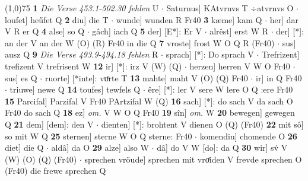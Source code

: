 \documentclass[8pt,a4paper,notitlepage]{article}
\begin{document}
\begin{table}[ht]
\begin{minipage}[t]{0.5\linewidth}
\line(1,0){75} \newline
\textbf{1} \textit{Die Verse 453.1-502.30 fehlen} U   $\cdot$ Saturnus] KAtvrnvs T ÷atvrnvs O  $\cdot$ loufet] heűfet Q \textbf{2} diu] die T  $\cdot$ wunde] wunden R Fr40 \textbf{3} kæme] kam Q  $\cdot$ her] dar V R er Q \textbf{4} alse] so Q  $\cdot$ gâch] iach Q \textbf{5} der] [E*]: Er V  $\cdot$ alrêst] erst W R  $\cdot$ der] [*]: an der V an der W (O) (R) Fr40 in die Q \textbf{7} vroste] frost W O Q R (Fr40)  $\cdot$ sus] ausz Q \textbf{9} \textit{Die Verse 493.9-494.18 fehlen} R   $\cdot$ sprach] [*]: Do sprach V  $\cdot$ Trefrizent] trefizent V trefrisent W \textbf{12} ir] [*]: irz V (W) (Q)  $\cdot$ herzen] herren V W O Fr40  $\cdot$ sus] es Q  $\cdot$ ruorte] [*inte]: vuͦrte T \textbf{13} mahte] maht V (O) (Q) Fr40  $\cdot$ ir] in Q Fr40  $\cdot$ triuwe] newe Q \textbf{14} toufes] tewfels Q  $\cdot$ êre] [*]: ler V sere W lere O Q :ere Fr40 \textbf{15} Parcifal] Parzifal V Fr40 PArtzifal W (Q) \textbf{16} sach] [*]: do sach V da sach O Fr40 do sach Q \textbf{18} ez] \textit{om.} V W O Q Fr40 \textbf{19} sîn] \textit{om.} W \textbf{20} bewegen] gewegen Q \textbf{21} dem] [dem]: den V  $\cdot$ dienten] [*]: brohtent V dienen O (Q) (Fr40) \textbf{22} mit sô] so mit W Q \textbf{25} sternen] sterne W O Q sterne: Fr40  $\cdot$ komendiu] chomende O \textbf{26} diet] die Q  $\cdot$ aldâ] da O \textbf{29} alze] also W  $\cdot$ dâ] do V W [do]: da Q \textbf{30} wir] sv́ V (W) (O) (Q) (Fr40)  $\cdot$ sprechen vröude] sprechen mit vroͤiden V frevde sprechen O (Fr40) die frewe sprechen Q \newline
\end{minipage}
\end{table}
\end{document}
